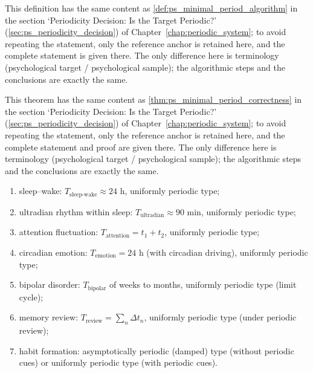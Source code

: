 \begin{definition}\label{def:psych_minimal_period_algorithm}
This definition has the same content as \cref{def:ps_minimal_period_algorithm} in the section `Periodicity Decision: Is the Target Periodic?' (\cref{sec:ps_periodicity_decision}) of Chapter~\ref{chap:periodic_system}; to avoid repeating the statement, only the reference anchor is retained here, and the complete statement is given there. The only difference here is terminology (psychological target / psychological sample); the algorithmic steps and the conclusions are exactly the same.
\end{definition}

\begin{theorem}\label{thm:psych_minimal_period_correctness}
This theorem has the same content as \cref{thm:ps_minimal_period_correctness} in the section `Periodicity Decision: Is the Target Periodic?' (\cref{sec:ps_periodicity_decision}) of Chapter~\ref{chap:periodic_system}; to avoid repeating the statement, only the reference anchor is retained here, and the complete statement and proof are given there. The only difference here is terminology (psychological target / psychological sample); the algorithmic steps and the conclusions are exactly the same.
\end{theorem}

\begin{example}\label{ex:psych_periodic_examples}
\leavevmode\par
\begin{enumerate}[label=(\roman*)]
    \item sleep--wake: $T_{\text{sleep-wake}}\approx 24$ h, uniformly periodic type;
    \item ultradian rhythm within sleep: $T_{\text{ultradian}}\approx 90$ min, uniformly periodic type;
    \item attention fluctuation: $T_{\text{attention}}=t_1+t_2$, uniformly periodic type;
    \item circadian emotion: $T_{\text{emotion}}=24$ h (with circadian driving), uniformly periodic type;
    \item bipolar disorder: $T_{\text{bipolar}}$ of weeks to months, uniformly periodic type (limit cycle);
    \item memory review: $T_{\text{review}}=\sum_n \Delta t_n$, uniformly periodic type (under periodic review);
    \item habit formation: asymptotically periodic (damped) type (without periodic cues) or uniformly periodic type (with periodic cues).
\end{enumerate}
\end{example}

